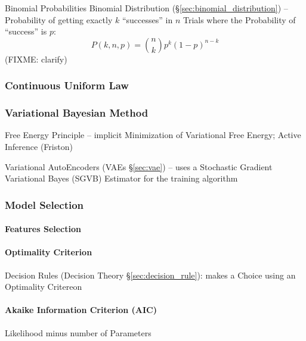 Binomial Probabilities \fist Binomial Distribution
(\S\ref{sec:binomial_distribution}) -- Probability of getting exactly $k$
``successes'' in $n$ Trials where the Probability of ``success'' is $p$:
\[
  P(k,n,p) = \binom{n}{k}p^k(1-p)^{n-k}
\]
(FIXME: clarify)



\subsubsection{Continuous Uniform Law}\label{sec:continuous_uniform_law}

\subsubsection{Variational Bayesian Method}\label{sec:variational_bayesian}

Free Energy Principle -- implicit Minimization of Variational Free Energy;
Active Inference (Friston)

Variational AutoEncoders (VAEs \S\ref{sec:vae}) -- uses a Stochastic Gradient
Variational Bayes (SGVB) Estimator for the training algorithm



\subsubsection{Model Selection}\label{sec:model_selection}

\paragraph{Features Selection}\label{sec:feature_selection}\hfill

\paragraph{Optimality Criterion}\label{sec:optimality_criterion}\hfill

\fist Decision Rules (Decision Theory \S\ref{sec:decision_rule}): makes a
Choice using an Optimality Critereon



\paragraph{Akaike Information Criterion (AIC)}\label{sec:aic}\hfill

Likelihood minus number of Parameters

